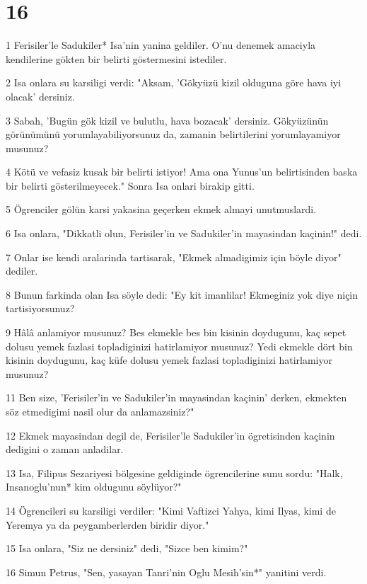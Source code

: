 \chapter{16}

\par 1 Ferisiler'le Sadukiler* Isa'nin yanina geldiler. O'nu denemek amaciyla kendilerine gökten bir belirti göstermesini istediler.
\par 2 Isa onlara su karsiligi verdi: "Aksam, 'Gökyüzü kizil olduguna göre hava iyi olacak' dersiniz.
\par 3 Sabah, 'Bugün gök kizil ve bulutlu, hava bozacak' dersiniz. Gökyüzünün görünümünü yorumlayabiliyorsunuz da, zamanin belirtilerini yorumlayamiyor musunuz?
\par 4 Kötü ve vefasiz kusak bir belirti istiyor! Ama ona Yunus'un belirtisinden baska bir belirti gösterilmeyecek." Sonra Isa onlari birakip gitti.
\par 5 Ögrenciler gölün karsi yakasina geçerken ekmek almayi unutmuslardi.
\par 6 Isa onlara, "Dikkatli olun, Ferisiler'in ve Sadukiler'in mayasindan kaçinin!" dedi.
\par 7 Onlar ise kendi aralarinda tartisarak, "Ekmek almadigimiz için böyle diyor" dediler.
\par 8 Bunun farkinda olan Isa söyle dedi: "Ey kit imanlilar! Ekmeginiz yok diye niçin tartisiyorsunuz?
\par 9 Hâlâ anlamiyor musunuz? Bes ekmekle bes bin kisinin doydugunu, kaç sepet dolusu yemek fazlasi topladiginizi hatirlamiyor musunuz? Yedi ekmekle dört bin kisinin doydugunu, kaç küfe dolusu yemek fazlasi topladiginizi hatirlamiyor musunuz?
\par 11 Ben size, 'Ferisiler'in ve Sadukiler'in mayasindan kaçinin' derken, ekmekten söz etmedigimi nasil olur da anlamazsiniz?"
\par 12 Ekmek mayasindan degil de, Ferisiler'le Sadukiler'in ögretisinden kaçinin dedigini o zaman anladilar.
\par 13 Isa, Filipus Sezariyesi bölgesine geldiginde ögrencilerine sunu sordu: "Halk, Insanoglu'nun* kim oldugunu söylüyor?"
\par 14 Ögrencileri su karsiligi verdiler: "Kimi Vaftizci Yahya, kimi Ilyas, kimi de Yeremya ya da peygamberlerden biridir diyor."
\par 15 Isa onlara, "Siz ne dersiniz" dedi, "Sizce ben kimim?"
\par 16 Simun Petrus, "Sen, yasayan Tanri'nin Oglu Mesih'sin*" yanitini verdi.
